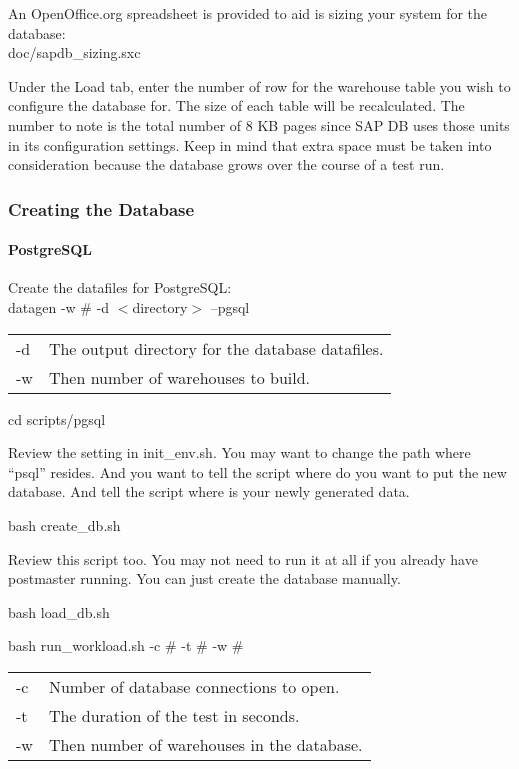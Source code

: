 \documentclass{article}
\begin{document}
\noindent
An OpenOffice.org spreadsheet is provided to aid is sizing your system for
the database: \\
\indent doc/sapdb\_sizing.sxc

\noindent
Under the Load tab, enter the number of row for the warehouse table you wish
to configure the database for.  The size of each table will be recalculated.
The number to note is the total number of 8 KB pages since SAP DB uses those
units in its configuration settings.  Keep in mind that extra space must be
taken into consideration because the database grows over the course of a test
run.

\subsubsection{Creating the Database}

\paragraph{PostgreSQL}

Create the datafiles for PostgreSQL: \\
\indent datagen -w \# -d $<$directory$>$ --pgsql \\
\begin{tabular}[c]{ll}
-d	& The output directory for the database datafiles. \\
-w	& Then number of warehouses to build. \\
\end{tabular}

\indent cd scripts/pgsql

Review the setting in init\_env.sh. You may want to change the path where
``psql'' resides. And you want to tell the script where do you want to put
the new database. And tell the script where is your newly generated data.

\indent bash create\_db.sh

Review this script too. You may not need to run it at all if you already have
postmaster running. You can just create the database manually.

\indent bash load\_db.sh

\indent bash run\_workload.sh -c \# -t \# -w \# \\
\begin{tabular}[c]{ll}
-c	& Number of database connections to open. \\
-t	& The duration of the test in seconds. \\
-w	& Then number of warehouses in the database. \\
\end{tabular}
\end{document}
